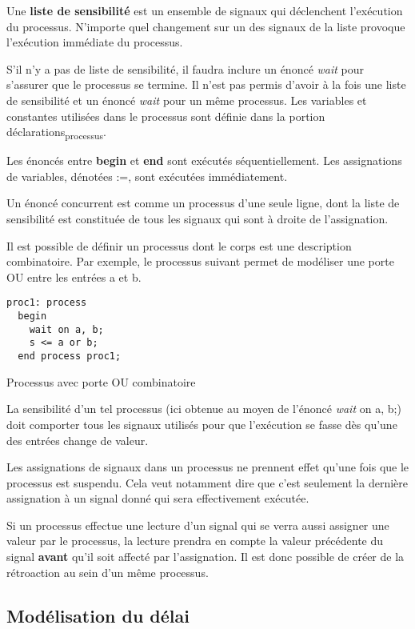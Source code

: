 \documentclass[11pt]{article}
\begin{document}
Une \textbf{liste de sensibilité} est un ensemble de signaux qui déclenchent
l'exécution du processus. N'importe quel changement sur un des signaux
de la liste provoque l'exécution immédiate du processus.

S'il n'y a pas de liste de sensibilité, il faudra inclure un énoncé
\emph{wait} pour s'assurer que le processus se termine. Il n'est pas permis
d'avoir à la fois une liste de sensibilité et un énoncé \emph{wait} pour un
même processus. Les variables et constantes utilisées dans le
processus sont définie dans la portion déclarations\textsubscript{processus}. 

Les énoncés entre \textbf{begin} et \textbf{end} sont exécutés séquentiellement. Les
assignations de variables, dénotées :=, sont exécutées immédiatement. 

Un énoncé concurrent est comme un processus d'une seule ligne, dont la
liste de sensibilité est constituée de tous les signaux qui sont à
droite de l'assignation.

Il est possible de définir un processus dont le corps est une
description combinatoire. Par exemple, le processus suivant permet de
modéliser une porte OU entre les entrées a et b. 

\begin{listing}[htbp]
\begin{verbatim}
proc1: process
  begin
    wait on a, b;
    s <= a or b;
  end process proc1;
\end{verbatim}
\caption{Processus avec porte OU combinatoire}
\end{listing}

La sensibilité d'un tel processus (ici obtenue au moyen de l'énoncé
\emph{wait} on a, b;) doit comporter tous les signaux utilisés pour que
l'exécution se fasse dès qu'une des entrées change de valeur.

Les assignations de signaux dans un processus ne prennent effet qu'une
fois que le processus est suspendu. Cela veut notamment dire que c'est
seulement la dernière assignation à un signal donné qui sera
effectivement exécutée.

Si un processus effectue une lecture d'un signal qui se verra aussi
assigner une valeur par le processus, la lecture prendra en compte la
valeur précédente du signal \textbf{avant} qu'il soit affecté par
l'assignation. Il est donc possible de créer de la rétroaction au sein
d'un même processus.

\subsection{Modélisation du délai}
\label{sec:org12ca7b8}
\end{document}
